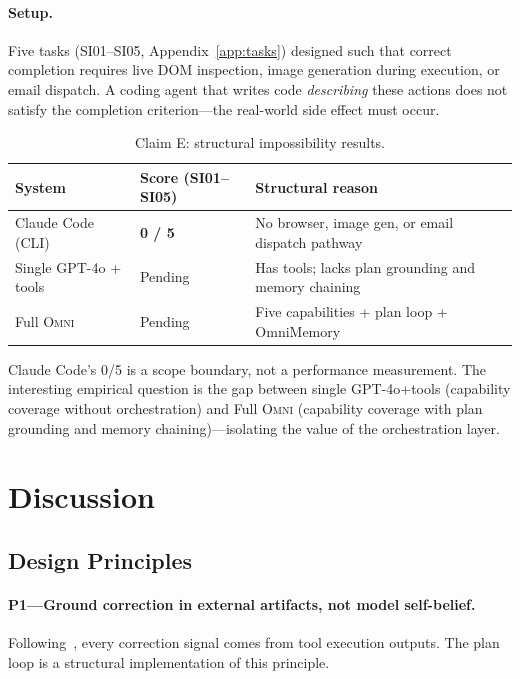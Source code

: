 \documentclass[11pt,a4paper]{article}
\newcommand{\omni}{\textsc{Omni}}
\begin{document}
\paragraph{Setup.} Five tasks (SI01--SI05, Appendix~\ref{app:tasks}) designed such that correct completion requires live DOM inspection, image generation during execution, or email dispatch. A coding agent that writes code \emph{describing} these actions does not satisfy the completion criterion---the real-world side effect must occur.

\begin{table}[h]
\centering
\caption{Claim E: structural impossibility results.}
\label{tab:claim_e}
\small
\begin{tabular}{lll}
\toprule
\textbf{System} & \textbf{Score (SI01--SI05)} & \textbf{Structural reason} \\
\midrule
Claude Code (CLI) & \textbf{0 / 5} & No browser, image gen, or email dispatch pathway \\
Single GPT-4o + tools & Pending & Has tools; lacks plan grounding and memory chaining \\
Full \omni{} & Pending & Five capabilities + plan loop + OmniMemory \\
\bottomrule
\end{tabular}
\end{table}

Claude Code's 0/5 is a scope boundary, not a performance measurement. The interesting empirical question is the gap between single GPT-4o+tools (capability coverage without orchestration) and Full \omni{} (capability coverage with plan grounding and memory chaining)---isolating the value of the orchestration layer.

\section{Discussion}
\label{sec:discussion}

\subsection{Design Principles}

\paragraph{P1---Ground correction in external artifacts, not model self-belief.} Following~\citet{huang2024llms}, every correction signal comes from tool execution outputs. The plan loop is a structural implementation of this principle.
\end{document}
